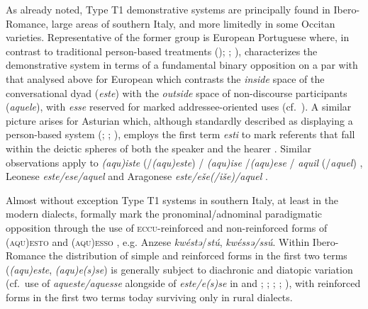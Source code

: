 \documentclass[output=paper]{langsci/langscibook}
\begin{document}
As already noted, Type T1 demonstrative systems are principally found in
Ibero-Romance, large areas of southern Italy, and more limitedly in some
Occitan varieties. Representative of the former group is European Portuguese
where, in contrast to traditional person-based treatments
(\citealt{Cunha:1984a}); \citealt[166]{Tlaskal:1994a};
\citealt{Topa-Valentim:2015a}), \textcites[93--95]{Jungbluth:2000a}%
[31]{Jungbluth:2003a}[§3.2.3.2]{Jungbluth:2017a} characterizes
the demonstrative system in terms of a fundamental binary opposition on a par
with that analysed above for European  which contrasts the \emph{inside}
space of the conversational dyad (\emph{este}) with the \emph{outside} space of
non-discourse participants (\emph{aquele}), with \emph{esse} reserved for
marked addressee-oriented uses (cf.\ \citealt[247--251]{Carvalho:1976a}). A
similar picture arises for Asturian which, although standardly described as
displaying a person-based system (\citealt[166]{Garcia-de-Diego:1946a};
\citealt[8]{Frias-Conde:1999a}; \citealt[103]{ALIA:2001a}), employs the first
term \emph{esti} to mark referents that fall within the deictic spheres of both
the speaker and the hearer \citep[105]{ALIA:2001a}. Similar observations apply
to  \emph{(aqu)iste} (/\emph{(aqu)este}) / \emph{(aqu)ise}
/\emph{(aqu)ese} / \emph{aquil} (/\emph{aquel})
\citep[94]{Garcia-de-Diego:1946a}, Leonese \emph{este/ese/aquel}
\citep[176]{Zamora-Vicente:1967a} and Aragonese \emph{este/eše(/iše)/aquel}
\citep[260]{Garcia-de-Diego:1946a}.

Almost without exception Type T1 systems in southern Italy, at least in the
modern dialects, formally mark the pronominal/adnominal paradigmatic opposition
through the use of \textsc{eccu}{}-reinforced and non-reinforced forms of
\textsc{(aqu)esto} and \textsc{(aqu)esso} \citep[71--74]{ledgeway2004sviluppo},
e.g. Anzese \emph{kwéstə}/\emph{stú}, \emph{kwéssə/ssú}. Within Ibero-Romance
the distribution of simple and reinforced forms in the first two terms
(\emph{(aqu)este}, \emph{(aqu)e(s)se}) is generally subject to diachronic and
diatopic variation (cf.\ use of \emph{aqueste/aquesse} alongside of
\emph{este/e(s)se} in  and ; \citealt[5]{Kjellman:1928a};
\citealt[39]{Teyssier:1980a}; \citealt[211]{Penny:2000a};
\citealt[§2.2.1.1]{Sornicola:2011a}), with reinforced forms in
the first two terms today surviving only in rural dialects.
\end{document}
